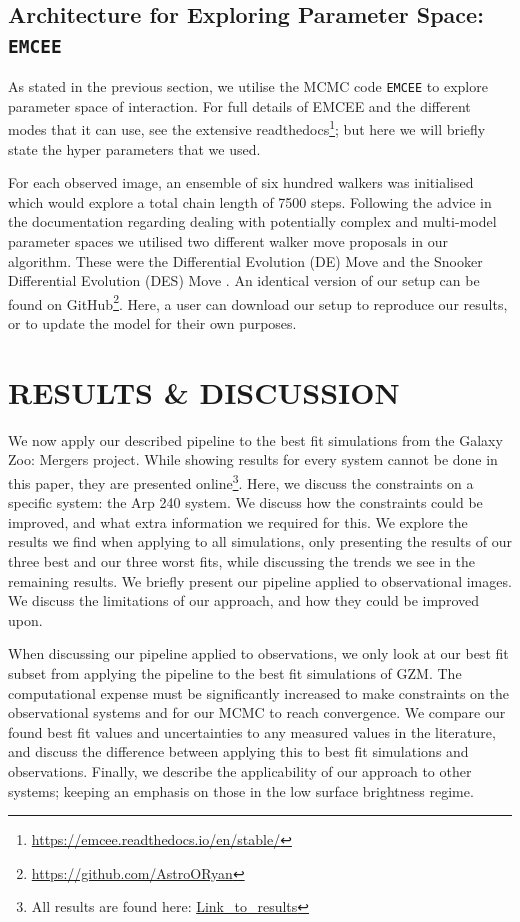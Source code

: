 \subsection{Architecture for Exploring Parameter Space: \texttt{EMCEE}}
As stated in the previous section, we utilise the MCMC code \texttt{EMCEE} \citep{2013PASP..125..306F} to explore parameter space of interaction. For full details of EMCEE and the different modes that it can use, see the extensive readthedocs\footnote{\url{https://emcee.readthedocs.io/en/stable/}}; but here we will briefly state the hyper parameters that we used. 

For each observed image, an ensemble of six hundred walkers was initialised which would explore a total chain length of 7500 steps. Following the advice in the documentation regarding dealing with potentially complex and multi-model parameter spaces we utilised two different walker move proposals in our algorithm. These were the Differential Evolution (DE) Move \citep{2014ApJS..210...11N} and the Snooker Differential Evolution (DES) Move \citep{ter_Braak_08}. An identical version of our setup can be found on GitHub\footnote{\url{https://github.com/AstroORyan}}. Here, a user can download our setup to reproduce our results, or to update the model for their own purposes.

\section{RESULTS \& DISCUSSION}\label{Results}
\noindent We now apply our described pipeline to the best fit simulations from the Galaxy Zoo: Mergers project. While showing results for every system cannot be done in this paper, they are presented online\footnote{All results are found here: \url{Link_to_results}}. Here, we discuss the constraints on a specific system: the Arp 240 system. We discuss how the constraints could be improved, and what extra information we required for this. We explore the results we find when applying to all simulations, only presenting the results of our three best and our three worst fits, while discussing the trends we see in the remaining results. We briefly present our pipeline applied to observational images. We discuss the limitations of our approach, and how they could be improved upon.

When discussing our pipeline applied to observations, we only look at our best fit subset from applying the pipeline to the best fit simulations of GZM. The computational expense must be significantly increased to make constraints on the observational systems and for our MCMC to reach convergence. We compare our found best fit values and uncertainties to any measured values in the literature, and discuss the difference between applying this to best fit simulations and observations. Finally, we describe the applicability of our approach to other systems; keeping an emphasis on those in the low surface brightness regime.

